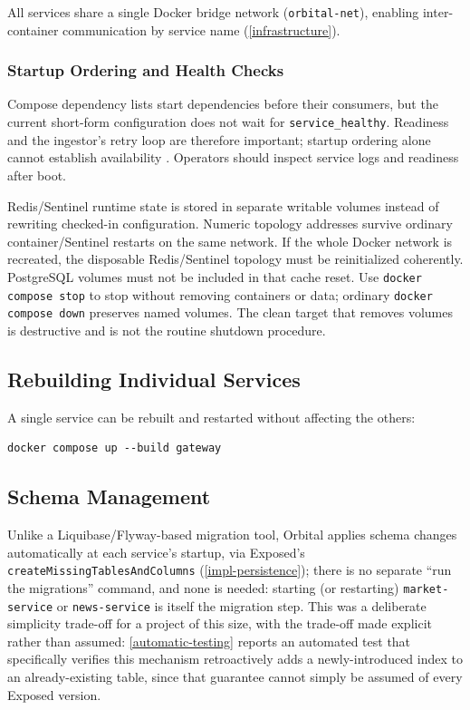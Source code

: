 \documentclass{scrartcl}
\begin{document}
All services share a single Docker bridge network (\texttt{orbital-net}), enabling inter-container
communication by service name (\cref{infrastructure}).

\subsubsection{Startup Ordering and Health Checks}\label{deployment-health}

Compose dependency lists start dependencies before their consumers, but the current short-form
configuration does not wait for \texttt{service\_healthy}. Readiness and the ingestor's retry loop
are therefore important; startup ordering alone cannot establish availability
\citep{docker2026startup}. Operators should inspect service logs and readiness after boot.

Redis/Sentinel runtime state is stored in separate writable volumes instead of rewriting checked-in
configuration. Numeric topology addresses survive ordinary container/Sentinel restarts on the same
network. If the whole Docker network is recreated, the disposable Redis/Sentinel topology must be
reinitialized coherently. PostgreSQL volumes must not be included in that cache reset.
Use \texttt{docker compose stop} to stop without removing containers or data; ordinary
\texttt{docker compose down} preserves named volumes. The clean target that removes volumes is
destructive and is not the routine shutdown procedure.

\subsection{Rebuilding Individual Services}\label{deployment-rebuild}

A single service can be rebuilt and restarted without affecting the others:
\par\medskip\noindent\begin{minipage}{\linewidth}
\begin{verbatim}
docker compose up --build gateway
\end{verbatim}
\end{minipage}\par\medskip

\subsection{Schema Management}\label{deployment-schema}

Unlike a Liquibase/Flyway-based migration tool, Orbital applies schema changes automatically at
each service's startup, via Exposed's \texttt{createMissingTablesAndColumns}
(\cref{impl-persistence}); there is no separate ``run the migrations'' command, and none is
needed: starting (or restarting) \texttt{market-service} or \texttt{news-service} is itself the
migration step. This was a deliberate simplicity trade-off for a project of this size, with the
trade-off made explicit rather than assumed: \cref{automatic-testing} reports an automated test
that specifically verifies this mechanism retroactively adds a newly-introduced index to an
already-existing table, since that guarantee cannot simply be assumed of every Exposed version.
\end{document}
